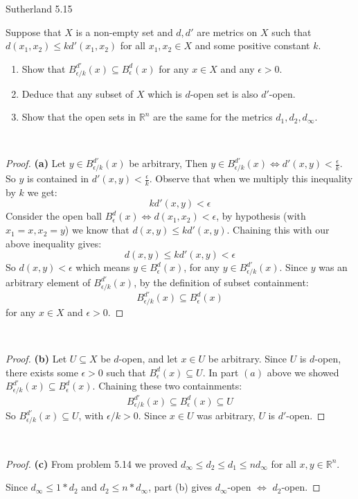 \documentclass[minion]{homework}
\newcommand{\Reals}{\ensuremath{\mathbb R}}%
\begin{document}
\begin{problems}
\problem Sutherland 5.15

Suppose that $X$ is a non-empty set and $d, d'$ are metrics on $X$ such that $d(x_1, x_2) \leq kd'(x_1,x_2)$ for all $x_1,x_2 \in X$ and some positive constant $k$.
\begin{enumerate}
  \item[(a)] Show that $B^{d'}_{\epsilon/k}(x)\subseteq B^d_\epsilon(x)$ for any $x \in X$ and any $ \epsilon > 0.$
  \item[(b)] Deduce that any subset of $X$ which is $d$-open set is also $d'$-open.
  \item[(c)] Show that the open sets in $\Reals^n$ are the same for the metrics $d_1, d_2, d_\infty$.
\end{enumerate}$ $
\begin{proof}
  \textbf{(a)} Let $y \in B^{d'}_{\epsilon/k}(x)$ be arbitrary, Then $y \in B^{d'}_{\epsilon/k}(x) \iff d'(x,y) < \frac{\epsilon}{k}$. So $y$ is contained in $d'(x, y) < \frac{\epsilon}{k}$. Observe that when we multiply this inequality by $k$ we get:
  $$kd'(x,y) < \epsilon$$
  Consider the open ball $B^d_\epsilon(x) \iff d(x_1, x_2) < \epsilon$, by hypothesis (with $x_1 = x, x_2 = y$) we know that $d(x,y) \leq kd'(x,y)$. Chaining this with our above inequality gives:
  $$d(x,y) \leq kd'(x,y) < \epsilon $$
  So $d(x,y) < \epsilon$ which means $y \in B^d_{\epsilon}(x)$, for any $y \in B^{d'}_{\epsilon/k}(x).$ Since $y$ was an arbitrary element of $B^{d'}_{\epsilon/k}(x)$, by the definition of subset containment:
  $$B^{d'}_{\epsilon/k}(x) \subseteq B^d_\epsilon(x)$$
  for any $x \in X$ and $\epsilon > 0.$
\end{proof}$ $\newline
\begin{proof} \textbf{(b)} Let $U \subseteq X$ be $d$-open, and let $x \in U$ be arbitrary. Since $U$ is $d$-open, there exists some $\epsilon > 0$ such that $B^d_\epsilon(x) \subseteq U$. In part $(a)$ above we showed $B^{d'}_{\epsilon/k}(x) \subseteq B^d_\epsilon(x)$. Chaining these two containments:
  $$B^{d'}_{\epsilon/k}(x) \subseteq B^d_\epsilon(x) \subseteq U$$
  So $B^{d'}_{\epsilon/k}(x) \subseteq U$, with $\epsilon/k > 0$. Since $x \in U$ was arbitrary, $U$ is $d'$-open.
\end{proof}$ $\newline
\begin{proof} \textbf{(c)} From problem 5.14 we proved $d_\infty \leq d_2 \leq d_1 \leq nd_\infty$ for all $x,y \in \Reals^n.$

  Since $d_\infty \leq 1 * d_2$ and $d_2 \leq n*d_\infty$, part (b) gives $d_\infty$-open $\iff$ $d_2$-open.


\end{proof}
\end{problems}
\end{document}
